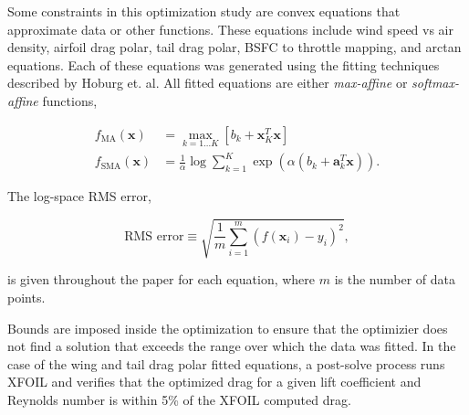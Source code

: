 Some constraints in this optimization study are convex equations that approximate data or other functions.  
These equations include wind speed vs air density, airfoil drag polar, tail drag polar, BSFC to throttle mapping, and arctan equations.  
Each of these equations was generated using the fitting techniques described by Hoburg et. al.\cite{fitting} 
All fitted equations are either \emph{max-affine} or \emph{softmax-affine} functions,

\begin{align}
    f_{\text{MA}} (\bm{x}) &= \max\limits_{k=1 \dots K} [b_k + \bm{x}_K^T\bm{x}] \\
    f_{\text{SMA}} (\bm{x}) &= \frac{1}{\alpha} \log{\sum_{k=1}^K \exp{(\alpha(b_k + \bm{a}_k^T \bm{x}))}}.
\end{align}

The log-space RMS error, 

\begin{equation}
\text{RMS error} \equiv \sqrt{\frac{1}{m} \sum_{i=1}^m (f(\bm{x}_i) - y_i)^2},
\end{equation}

 is given throughout the paper for each equation, where $m$ is the number of data points. 

Bounds are imposed inside the optimization to ensure that the optimizier does not find a solution that exceeds the range over which the data was fitted.  In the case of the wing and tail drag polar fitted equations, a post-solve process runs XFOIL and verifies that the optimized drag for a given lift coefficient and Reynolds number is within 5\% of the XFOIL computed drag.

